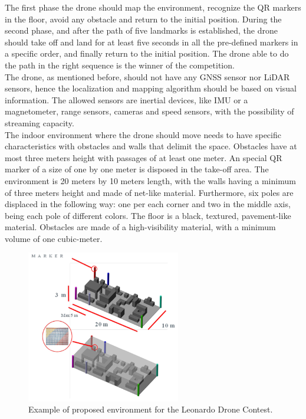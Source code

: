 The first phase the drone should map the environment, recognize the QR markers in the floor, avoid any obstacle and return to the initial position. During the second phase, and after the path of five landmarks is established, the drone should take off and land for at least five seconds in all the pre-defined markers in a specific order, and finally return to the initial position. The drone able to do the path in the right sequence is the winner of the competition. \\

The drone, as mentioned before, should not have any GNSS sensor nor LiDAR sensors, hence the localization and mapping algorithm should be based on visual information. The allowed sensors are inertial devices, like IMU or a magnetometer, range sensors, cameras and speed sensors, with the possibility of streaming capacity. \\

The indoor environment where the drone should move needs to have specific characteristics with obstacles and walls that delimit the space. Obstacles have at most three meters height with passages of at least one meter. An special QR marker of a size of one by one meter is disposed in the take-off area. The environment is 20 meters by 10 meters length, with the walls having a minimum of three meters height and made of net-like material. Furthermore, six poles are displaced in the following way: one per each corner and two in the middle axis, being each pole of different colors. The floor is a black, textured, pavement-like material. Obstacles are made of a high-visibility material, with a minimum volume of one cubic-meter.\\
\begin{figure}
    \centering
    \includegraphics[width=0.6\textwidth]{Images/fig25-contest-env.png}
    \caption[Example of proposed environment]{Example of proposed environment for the Leonardo Drone Contest.}
    \label{fig:chapter0:contest-env}
\end{figure}

